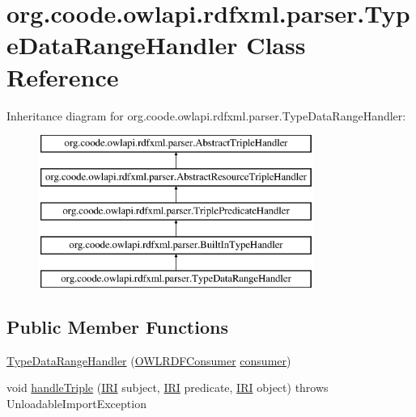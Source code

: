 \hypertarget{classorg_1_1coode_1_1owlapi_1_1rdfxml_1_1parser_1_1_type_data_range_handler}{\section{org.\-coode.\-owlapi.\-rdfxml.\-parser.\-Type\-Data\-Range\-Handler Class Reference}
\label{classorg_1_1coode_1_1owlapi_1_1rdfxml_1_1parser_1_1_type_data_range_handler}
}
Inheritance diagram for org.\-coode.\-owlapi.\-rdfxml.\-parser.\-Type\-Data\-Range\-Handler\-:\begin{figure}[H]
\begin{center}
\leavevmode
\includegraphics[height=5.000000cm]{classorg_1_1coode_1_1owlapi_1_1rdfxml_1_1parser_1_1_type_data_range_handler}
\end{center}
\end{figure}
\subsection*{Public Member Functions}
\begin{DoxyCompactItemize}
\item 
\hyperlink{classorg_1_1coode_1_1owlapi_1_1rdfxml_1_1parser_1_1_type_data_range_handler_aaa234e99c47072193d6b1f0567b9b726}{Type\-Data\-Range\-Handler} (\hyperlink{classorg_1_1coode_1_1owlapi_1_1rdfxml_1_1parser_1_1_o_w_l_r_d_f_consumer}{O\-W\-L\-R\-D\-F\-Consumer} \hyperlink{classorg_1_1coode_1_1owlapi_1_1rdfxml_1_1parser_1_1_abstract_triple_handler_a4ccf4d898ff01eb1cadfa04b23d54e9c}{consumer})
\item 
void \hyperlink{classorg_1_1coode_1_1owlapi_1_1rdfxml_1_1parser_1_1_type_data_range_handler_a161a1a871ba0f8eda4c34f987396564d}{handle\-Triple} (\hyperlink{classorg_1_1semanticweb_1_1owlapi_1_1model_1_1_i_r_i}{I\-R\-I} subject, \hyperlink{classorg_1_1semanticweb_1_1owlapi_1_1model_1_1_i_r_i}{I\-R\-I} predicate, \hyperlink{classorg_1_1semanticweb_1_1owlapi_1_1model_1_1_i_r_i}{I\-R\-I} object)  throws Unloadable\-Import\-Exception 
\end{DoxyCompactItemize}
